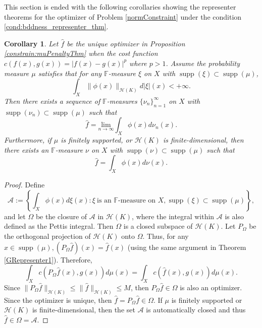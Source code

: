 \documentclass{amsart}
\numberwithin{equation}{section}
\DeclareMathOperator{\supp}{supp}
\theoremstyle{plain}
\newtheorem{corollary}[subsection]{Corollary}
\theoremstyle{remark}
\theoremstyle{definition}
\begin{document}
This section is ended with the following corollaries showing the representer theorems for the optimizer of Problem \ref{normConstraint} under the condition \ref{cond:bddness_representer_thm}.
\begin{corollary}\label{constraint: GRepresenter1}
  Let $\hat{f}$ be the unique optimizer in Proposition \ref{constrain:muPenaltyThm} when the cost function $c(f(x), g(x)) = |f(x)-g(x)|^p$ where $p>1$.
 Assume the probability measure $\mu$ satisfies that for any $\mathbb{F}$-measure $\xi$ on $X$ with $\supp (\xi) \subset \supp(\mu)$,%
\begin{equation*}%
    \int_X \|\phi(x)\|_{\mathscr{H}(K)}d|\xi|(x)<+\infty.
\end{equation*}
Then there exists a sequence of $\mathbb{F}$-measures $\{\nu_n\}_{n=1}^{\infty}$ on $X$ with  $\supp(\nu_n) \subset \supp(\mu)$ such that 
\begin{equation*}
    \hat{f} = \underset{n \rightarrow \infty}{\text{lim}}\int_{X} \phi(x) d\nu_n(x).
\end{equation*} 
Furthermore, if $\mu$ is finitely supported, or $\mathscr{H}(K)$ is finite-dimensional, then there exists an $\mathbb{F}$-measure $\nu$ on $X$ with  $\supp(\nu) \subset \supp(\mu)$ such that 
\begin{equation*}
    \hat{f} = \int_{X} \phi(x) d\nu(x).
\end{equation*} 
\end{corollary}

\begin{proof}
Define
    \begin{equation*}
        \mathscr{A}:=\left\{\int_{X} \phi(x) d\xi(x): \xi \ \text{is an $\mathbb{F}$-measure on $X$}, \supp(\xi) \subset \supp(\mu) \right \},
    \end{equation*}
    and let $\Omega$ be the closure of $\mathscr{A}$ in $\mathscr{H}(K)$, where the integral within $\mathscr{A}$ is also defined as the Pettis integral.
Then $\Omega$ is a closed subspace of $ \mathscr{H}(K)$.  Let $P_\Omega$ be the orthogonal projection of $ \mathscr{H}(K)$ onto $\Omega$. Thus, for any $x \in \supp(\mu), (P_\Omega \hat{f})(x) =  \hat{f}(x)$ (using the same argument in Theorem \ref{GRepresenter1}). Therefore, 
  \begin{equation*}
   \int_{X} c( P_\Omega \hat{f}(x), g(x))  d\mu(x) =  \int_{X} c( \hat{f}(x), g(x))  d\mu(x).
\end{equation*}
Since $\|P_\Omega \hat{f}\|_{\mathscr{H}(K)} \leq \| \hat{f}\|_{\mathscr{H}(K)} \leq M$, then  $P_\Omega \hat{f} \in \Omega$ is also an optimizer.
Since the optimizer is unique,  then $\hat{f} = P_\Omega \hat{f} \in \Omega$.
If $\mu$ is finitely supported or $\mathscr{H}(K)$ is finite-dimensional, then the set $\mathscr{A}$ is automatically closed and thus $ \hat{f} \in \Omega = \mathscr{A}$.
\end{proof}
\end{document}
